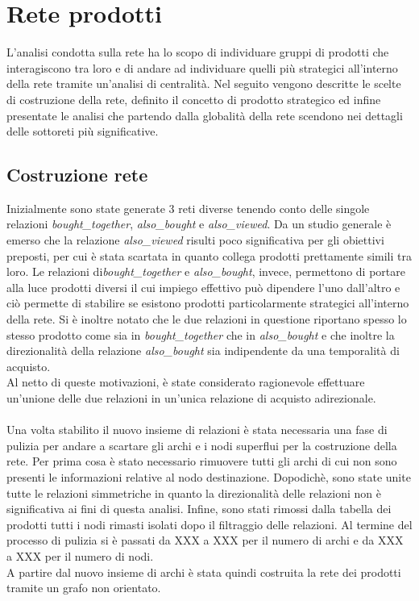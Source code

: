\section{Rete prodotti}\label{ReteProdotti}
L'analisi condotta sulla rete ha lo scopo di individuare gruppi di prodotti che interagiscono tra loro e di andare ad individuare quelli più strategici all'interno della rete tramite un'analisi di centralità. Nel seguito vengono descritte le scelte di costruzione della rete, definito il concetto di prodotto strategico ed infine presentate le analisi che partendo dalla globalità della rete scendono nei dettagli delle sottoreti più significative. 

\subsection{Costruzione rete}
Inizialmente sono state generate 3 reti diverse tenendo conto delle singole relazioni \textit{bought\_together}, \textit{also\_bought} e \textit{also\_viewed}. Da un studio generale è emerso che la relazione \textit{also\_viewed} risulti poco significativa per gli obiettivi preposti, per cui è stata scartata in quanto collega prodotti prettamente simili tra loro. Le relazioni di\textit{bought\_together} e \textit{also\_bought}, invece, permettono di portare alla luce prodotti diversi il cui impiego effettivo può dipendere l'uno dall'altro e ciò permette di stabilire se esistono prodotti particolarmente strategici all'interno della rete. Si è inoltre notato che le due relazioni in questione riportano spesso lo stesso prodotto come sia in \textit{bought\_together} che in \textit{also\_bought} e che inoltre la direzionalità della relazione \textit{also\_bought} sia indipendente da una temporalità di acquisto. \\
Al netto di queste motivazioni, è state considerato ragionevole effettuare un'unione delle due relazioni in un'unica relazione di acquisto adirezionale. 
\\\\
Una volta stabilito il nuovo insieme di relazioni è stata necessaria una fase di pulizia per andare a scartare gli archi e i nodi superflui per la costruzione della rete. Per prima cosa è stato necessario rimuovere tutti gli archi di cui non sono presenti le informazioni relative al nodo destinazione. Dopodichè, sono state unite tutte le relazioni simmetriche in quanto la direzionalità delle relazioni non è significativa ai fini di questa analisi. Infine, sono stati rimossi dalla tabella dei prodotti tutti i nodi rimasti isolati dopo il filtraggio delle relazioni. Al termine del processo di pulizia si è passati da XXX a XXX per il numero di archi e da XXX a XXX per il numero di nodi. \\
A partire dal nuovo insieme di archi è stata quindi costruita la rete dei prodotti tramite un grafo non orientato.



